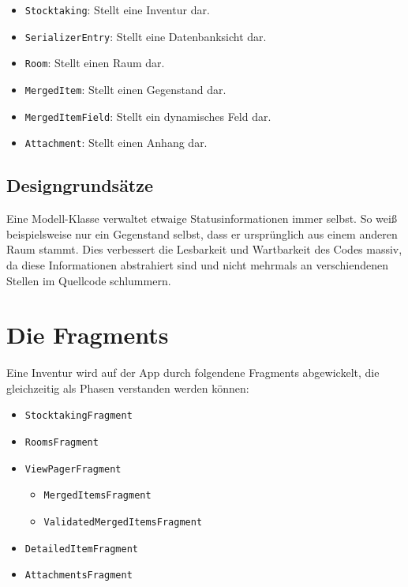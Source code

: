 \begin{itemize}
\tightlist
\item
  \texttt{Stocktaking}: Stellt eine Inventur dar.
\item
  \texttt{SerializerEntry}: Stellt eine Datenbanksicht dar.
\item
  \texttt{Room}: Stellt einen Raum dar.
\item
  \texttt{MergedItem}: Stellt einen Gegenstand dar.
\item
  \texttt{MergedItemField}: Stellt ein dynamisches Feld dar.
\item
  \texttt{Attachment}: Stellt einen Anhang dar.
\end{itemize}

\hypertarget{designgrundsuxe4tze}{%
\subsection{Designgrundsätze}\label{designgrundsuxe4tze}}

Eine Modell-Klasse verwaltet etwaige Statusinformationen immer selbst.
So weiß beispielsweise nur ein Gegenstand selbst, dass er ursprünglich
aus einem anderen Raum stammt. Dies verbessert die Lesbarkeit und
Wartbarkeit des Codes massiv, da diese Informationen abstrahiert sind
und nicht mehrmals an verschiendenen Stellen im Quellcode schlummern.

\hypertarget{die-fragments}{%
\section{Die Fragments}\label{die-fragments}}

Eine Inventur wird auf der App durch folgendene Fragments abgewickelt,
die gleichzeitig als Phasen verstanden werden können:

\begin{itemize}
\tightlist
\item
  \texttt{StocktakingFragment}
\item
  \texttt{RoomsFragment}
\item
  \texttt{ViewPagerFragment}

  \begin{itemize}
  \tightlist
  \item
    \texttt{MergedItemsFragment}
  \item
    \texttt{ValidatedMergedItemsFragment}
  \end{itemize}
\item
  \texttt{DetailedItemFragment}
\item
  \texttt{AttachmentsFragment}
\end{itemize}

